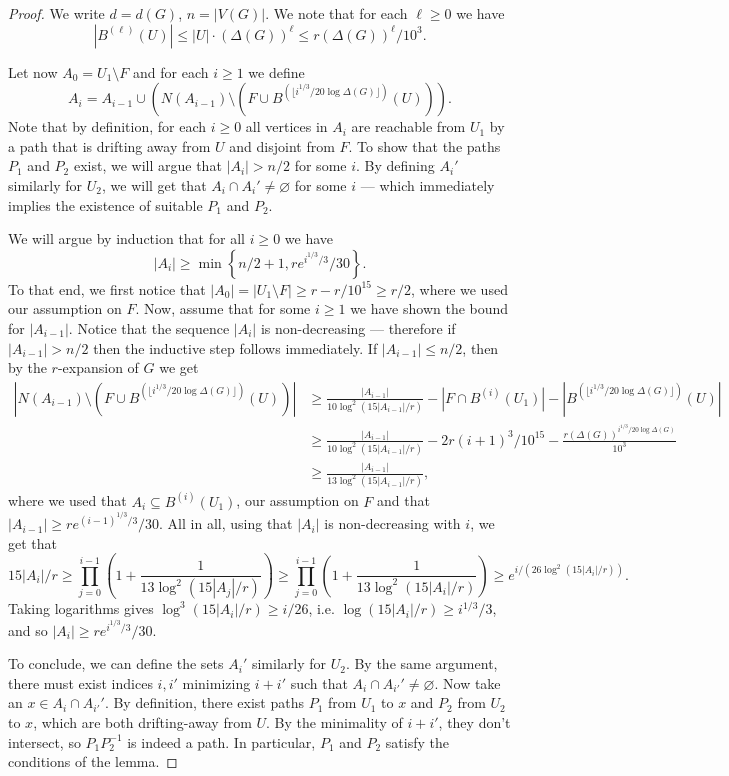 \documentclass[10pt, a4paper]{article}
\numberwithin{theorem}{section} %
\theoremstyle{remark}
\theoremstyle{definition}
\begin{document}
\begin{proof}
    We write $d = d(G)$, $n = |V(G)|$.
    We note that for each $\ell \geq 0$ we have
    \[
        |B^{(\ell)}(U)| \leq |U| \cdot (\Delta(G))^{\ell} \leq r(\Delta(G))^{\ell}/10^3.
    \]

    Let now $A_0 = U_1 \setminus F$ and for each $i \geq 1$ we define
    \[
        A_i = A_{i-1} \cup \left( N(A_{i-1}) \setminus (F \cup B^{(\lfloor i^{1/3}/20\log \Delta(G)\rfloor)}(U)) \right).
    \]
    Note that by definition, for each $i \geq 0$ all vertices in $A_i$ are reachable from $U_1$ by a path that is drifting away from $U$ and disjoint from $F$.
    To show that the paths $P_1$ and $P_2$ exist, we will argue that $|A_i| > n/2$ for some $i$.
    By defining $A_i'$ similarly for $U_2$, we will get that $A_i \cap A_i' \neq \varnothing$ for some $i$ --- which immediately implies the existence of suitable $P_1$ and $P_2$.

    We will argue by induction that for all $i \geq 0$ we have
    \[
        |A_i| \geq \min \left\{ n/2 + 1, re^{i^{1/3}/3}/30 \right\}.
    \]
    To that end, we first notice that $|A_0| = |U_1 \setminus F| \geq r - r/10^{15} \geq r/2$, where we used our assumption on $F$.
    Now, assume that for some $i \geq 1$ we have shown the bound for $|A_{i-1}|$.
    Notice that the sequence $|A_i|$ is non-decreasing --- therefore if $|A_{i-1}| > n/2$ then the inductive step follows immediately.
    If $|A_{i-1}| \leq n/2$, then by the $r$-expansion of $G$ we get
    \begin{align*}
        |N(A_{i-1}) \setminus (F \cup B^{(\lfloor i^{1/3}/20\log \Delta(G) \rfloor)}(U))| &\geq \frac{|A_{i-1}|}{10\log^2 (15|A_{i-1}| / r)} - |F \cap B^{(i)}(U_1)| - |B^{(\lfloor i^{1/3} / 20 \log \Delta(G) \rfloor)} (U)|\\
        &\geq \frac{|A_{i-1}|}{10\log^2 (15|A_{i-1}| / r)} - 2r(i+1)^3/10^{15} - \frac{r (\Delta(G))^{i^{1/3}/20\log\Delta(G)}}{10^3}\\
        &\geq \frac{|A_{i-1}|}{13\log^2 (15|A_{i-1}| / r)},
    \end{align*}
    where we used that $A_i \subseteq B^{(i)}(U_1)$, our assumption on $F$ and that $|A_{i-1}| \geq re^{(i-1)^{1/3}/3}/30$.
    All in all, using that $|A_i|$ is non-decreasing with $i$, we get that
    \[
        15|A_i| / r \geq \prod_{j=0}^{i-1} \left(1 + \frac{1}{13\log^2(15|A_j|/r)} \right) \geq \prod_{j=0}^{i-1} \left(1 + \frac{1}{13\log^2(15|A_i|/r)} \right) \geq e^{i/(26\log^2 (15|A_i|/r))}.
    \]
    Taking logarithms gives $\log^3 (15|A_i|/r)\geq i/26$, i.e. $\log (15|A_i|/r)\geq i^{1/3}/3$, and so $|A_i| \geq re^{i^{1/3}/3}/30$.

    To conclude, we can define the sets $A_i'$ similarly for $U_2$.
    By the same argument, there must exist indices $i, i'$ minimizing $i + i'$ such that $A_i \cap A_{i'}' \neq \varnothing$.
    Now take an $x \in A_i \cap A_{i'}'$.
    By definition, there exist paths $P_1$ from $U_1$ to $x$ and $P_2$ from $U_2$ to $x$, which are both drifting-away from $U$.
    By the minimality of $i+ i'$, they don't intersect, so $P_1P_2^{-1}$ is indeed a path. 
    In particular, $P_1$ and $P_2$ satisfy the conditions of the lemma.
\end{proof}
\end{document}
